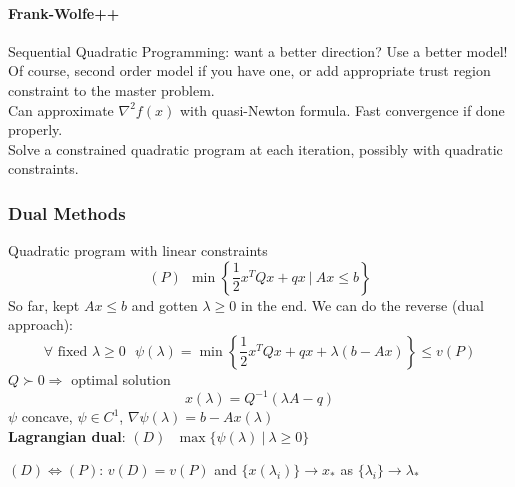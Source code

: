 \documentclass[10pt]{report}
\begin{document}
\paragraph{Frank-Wolfe++} Sequential Quadratic Programming: want a better direction? Use a better model! Of course, second order model if you have one, or add appropriate trust region constraint to the master problem.\\
Can approximate $\nabla^2 f(x)$ with quasi-Newton formula. Fast convergence if done properly.\\
Solve a constrained quadratic program at each iteration, possibly with quadratic constraints.
\subsubsection{Dual Methods}
Quadratic program with linear constraints $$(P)\:\:\min\left\{\frac{1}{2}x^TQx+qx\:|\:Ax\leq b\right\}$$
So far, kept $Ax\leq b$ and gotten $\lambda \geq 0$ in the end. We can do the reverse (dual approach):
$$\forall\text{ fixed }\lambda\geq 0\:\:\:\psi(\lambda)=\min\left\{\frac{1}{2}x^TQx + qx + \lambda(b-Ax)\right\}\leq v(P)$$
$Q\succ 0\Rightarrow$ optimal solution $$x(\lambda)=Q^{-1}(\lambda A-q)$$
$\psi$ concave, $\psi\in C^1$, $\nabla\psi(\lambda)=b-Ax(\lambda)$\\
\textbf{Lagrangian dual}: $(D)\:\:\:\max\{\psi(\lambda)\:|\:\lambda\geq 0\}$
\begin{list}{}{}
	\item $(D)\Leftrightarrow (P)$: $v(D) = v(P)$ and $\{x(\lambda_i)\}\rightarrow x_*$ as $\{\lambda_i\}\rightarrow \lambda_*$
\end{list}
\end{document}
